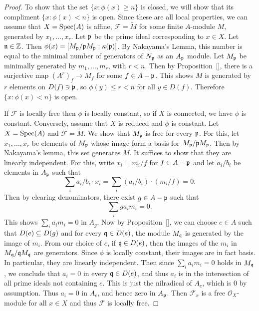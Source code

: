 \documentclass[11pt]{book}
\theoremstyle{definition}
\begin{document}
\begin{proof}
To show that the set $\{x:\phi(x)\geq n\}$ is closed, we will show that its compliment $\{x:\phi(x)<n\}$ is open. Since these are all local properties, we can assume that $X=\mathrm{Spec}(A)$ is affine, $\mathscr{F}=\widetilde{M}$ for some finite $A$-module $M$, generated by $x_1,\dots,x_r$. Let $\mathfrak{p}$ be the prime ideal corresponding to $x\in X$. Let $\mathfrak{n}\in\mathbb{Z}$. Then $\phi(x)=[M_{\mathfrak{p}}/\mathfrak{p} M_{\mathfrak{p}}:\kappa(\mathfrak{p})]$. By Nakayama's Lemma, this number is equal to the minimal number of generators of $N_{\mathfrak{p}}$ as an $A_{\mathfrak{p}}$ module. Let $M_{\mathfrak{p}}$ be minimally generated by $m_1,\dots,m_r$, with $r<n$. Then by Proposition~\ref{}, there is a surjective map $(A^r)_f\to M_f$ for some $f\in A-\mathfrak{p}$. This shows $M$ is generated by $r$ elements on $D(f)\ni\mathfrak{p}$, so $\phi(y)\leq r<n$ for all $y\in D(f)$. Therefore $\{x:\phi(x)<n\}$ is open.\par
If $\mathscr{F}$ is locally free then $\phi$ is locally constant, so if $X$ is connected, we have $\phi$ is constant. Conversely, assume that $X$ is reduced and $\phi$ is constant. Let $X=\mathrm{Spec}(A)$ and $\mathscr{F}=\widetilde{M}$. We show that $M_{\mathfrak{p}}$ is free for every $\mathfrak{p}$. For this, let $x_1,\dots,x_r$ be elements of $M_{\mathfrak{p}}$ whose image form a basis for $M_{\mathfrak{p}}/\mathfrak{p} M_{\mathfrak{p}}$. Then by Nakayama's lemma, this set generates $M$. It suffices to show that they are linearly independent. For this, write $x_i=m_i/f$ for $f\in A-\mathfrak{p}$ and let $a_i/b_i$ be elements in $A_{\mathfrak{p}}$ such that
\[\sum_ia_i/b_i\cdot x_i=\sum_i(a_i/b_i)\cdot(m_i/f)=0.\]
Then by clearing denominators, there exist $g\in A-\mathfrak{p}$ such that
\[\sum_iga_im_i=0.\]
This shows $\sum_ia_im_i=0$ in $A_g$. Now by Proposition~\ref{}, we can choose $e\in A$ such that $D(e)\subseteq D(g)$ and for every $\mathfrak{q}\in D(e)$, the module $M_{\mathfrak{q}}$ is generated by the image of $m_i$. From our choice of $e$, if $\mathfrak{q}\in D(e)$, then the images of the $m_i$ in $M_{\mathfrak{q}}/\mathfrak{q} M_{\mathfrak{q}}$ are generators. Since $\phi$ is locally constant, their images are in fact basis. In particular, they are linearly independent. Then since $\sum_ia_im_i=0$ holds in $M_{\mathfrak{q}}$, we conclude that $a_i=0$ in every $\mathfrak{q}\in D(e)$, and thus $a_i$ is in the intersection of all prime ideals not containing $e$. This is just the nilradical of $A_e$, which is $0$ by assumption. Thus $a_i=0$ in $A_e$, and hence zero in $A_{\mathfrak{p}}$. Then $\mathscr{F}_x$ is a free $\mathscr{O}_X$-module for all $x\in X$ and thus $\mathscr{F}$ is locally free.
\end{proof}
\end{document}
